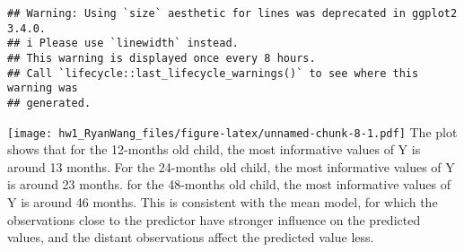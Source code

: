 \documentclass[
]{article}
\newenvironment{Shaded}{\begin{snugshade}}{\end{snugshade}}
\newcommand{\AttributeTok}[1]{\textcolor[rgb]{0.13,0.29,0.53}{#1}}
\newcommand{\DecValTok}[1]{\textcolor[rgb]{0.00,0.00,0.81}{#1}}
\newcommand{\FunctionTok}[1]{\textcolor[rgb]{0.13,0.29,0.53}{\textbf{#1}}}
\newcommand{\NormalTok}[1]{#1}
\newcommand{\OtherTok}[1]{\textcolor[rgb]{0.56,0.35,0.01}{#1}}
\newcommand{\SpecialCharTok}[1]{\textcolor[rgb]{0.81,0.36,0.00}{\textbf{#1}}}
\newcommand{\StringTok}[1]{\textcolor[rgb]{0.31,0.60,0.02}{#1}}
\begin{document}
\begin{Shaded}
\end{Shaded}

\begin{verbatim}
## Warning: Using `size` aesthetic for lines was deprecated in ggplot2 3.4.0.
## i Please use `linewidth` instead.
## This warning is displayed once every 8 hours.
## Call `lifecycle::last_lifecycle_warnings()` to see where this warning was
## generated.
\end{verbatim}

\texttt{[image: hw1\_RyanWang\_files/figure-latex/unnamed-chunk-8-1.pdf]}
The plot shows that for the 12-months old child, the most informative
values of Y is around 13 months. For the 24-months old child, the most
informative values of Y is around 23 months. for the 48-months old
child, the most informative values of Y is around 46 months. This is
consistent with the mean model, for which the observations close to the
predictor have stronger influence on the predicted values, and the
distant observations affect the predicted value less.
\end{document}

